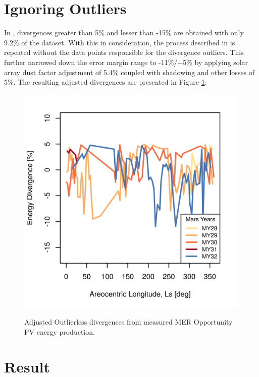 \clearpage
\section{Ignoring Outliers}
\label{sec:Appendix:NarrowedEnergyPredictionErrorMarginRange:IgnoringOutliers}

In , divergences greater than 5\% and lesser than -15\% are obtained with only 9.2\% of the dataset. With this in consideration, the process described in  is repeated without the data points responsible for the divergence outliers. This further narrowed down the error margin range to -11\%/+5\% by applying solar array dust factor adjustment of 5.4\% coupled with shadowing and other losses of 5\%. The resulting adjusted divergences are presented in Figure \ref{fig:plot:mer-energy-prediction-divergences-adjusted-without-outliers}:

\begin{figure}[h]
  \centering
  \hypersetup{linkcolor=captionTextColor}
  \includegraphics[width=0.5\linewidth]{sections/appendix/energy-error-margin/plots/energy-prediction-divergences-from-my28-to-my32-adjusted-without-outliers.png}\\
  \caption[Adjusted Outlierless divergences from measured \ac{MER} Opportunity PV energy production]
          {Adjusted Outlierless divergences from measured \ac{MER} Opportunity PV energy production.}
  \label{fig:plot:mer-energy-prediction-divergences-adjusted-without-outliers}
\end{figure}


\section{Result}
\label{sec:Appendix:NarrowedEnergyPredictionErrorMarginRange:Conclusion}

